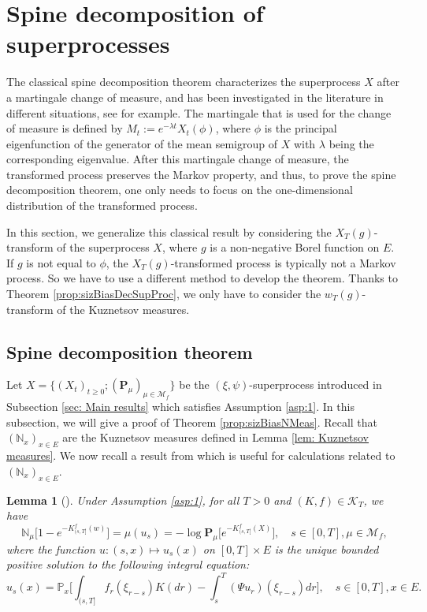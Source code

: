 \documentclass[UTF8]{pkuthss}
\theoremstyle{plain}
\newtheorem{lem}[thm]{Lemma}
\theoremstyle{definition}
\numberwithin{equation}{section}
\begin{document}
\section{Spine decomposition of superprocesses}
	The  classical spine decomposition theorem characterizes the superprocess  $X$ after a martingale change of measure, and has been investigated in the literature in different situations, see \cite{EckhoffKyprianouWinkel2015Spines, EnglanderKyprianou2004Local, LiuRenSong2009LlogL} for example.
	The martingale that is used for the change of measure is defined by $M_t := e^{-\lambda t}X_t(\phi)$, where $\phi$ is the principal eigenfunction of the generator of the mean semigroup of $X$ with $\lambda$ being the corresponding eigenvalue.
	After this martingale change of measure, the transformed process preserves the Markov property, and thus, to prove the spine decomposition theorem, one only needs to focus on the one-dimensional distribution of the transformed process.
\par
	In this section, we generalize this classical result by considering the $X_T(g)$-transform of the superprocess $X$, where $g$ is a non-negative Borel function on $E$.
	If $g$ is not equal to $\phi$, the $X_T(g)$-transformed process is typically not a Markov process.
	So we have to use a different method to develop the theorem.
	Thanks to Theorem \ref{prop:sizBiasDecSupProc},
	we only have to consider the $w_T(g)$-transform of the Kuznetsov measures.
\subsection{Spine decomposition theorem}
	Let $X=\{(X_t)_{t\geq 0}; (\mathbf P_\mu)_{\mu \in \mathcal M_f}\}$ be the $(\xi,\psi)$-superprocess introduced in Subsection \ref{sec: Main results} which satisfies Assumption \ref{asp:1}.
	In this subsection, we will give a proof of Theorem \ref{prop:sizBiasNMeas}.
	Recall that $(\mathbb N_x)_{x\in E}$ are the Kuznetsov measures defined in Lemma \ref{lem: Kuznetsov measures}. We now recall a result from \cite{Li2011Measure-valued} which is useful for calculations related to $(\mathbb N_x)_{x\in E}$.
\begin{lem}[{\cite[Theorems 5.15 and 8.23]{Li2011Measure-valued}}]\label{lem:EquatDescNmeas}
	Under Assumption \ref{asp:1}, for all $T> 0$ and $(K,f) \in \mathcal K_T$, we have
\[
	\mathbb N_\mu \big[ 1 - e^{-K_{(s, T]}^f(w)} \big]
	= \mu(u_s)
	= -\log \mathbf P_{\mu} \big[ e^{-K_{(s, T]}^f(X)} \big],
	\quad s\in [0,T], \mu \in \mathcal M_f,
\]
	where the function $u: (s,x) \mapsto u_s(x)$ on $[0,T] \times E$ is the unique bounded positive solution to the following integral equation:
\[
	u_s(x)
    =\mathbb P_x \Big[\int_{(s,T]} f_r(\xi_{r-s}) K(dr) -
    \int_s^T (\Psi u_r)(\xi_{r-s}) dr \Big],
    \quad s \in [0,T], x \in E.
\]
\end{lem}
\end{document}
